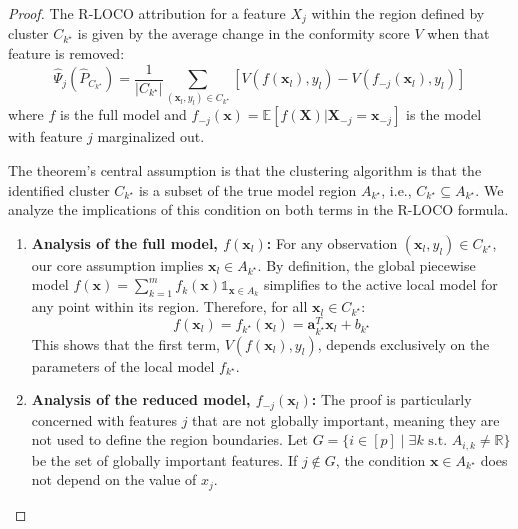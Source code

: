\documentclass{article}
\theoremstyle{plain}
\theoremstyle{definition}
\theoremstyle{remark}
\begin{document}
\begin{proof}
The R-LOCO attribution for a feature $X_j$ within the region defined by cluster $C_{k^\star}$ is given by the average change in the conformity score $V$ when that feature is removed:
$$
\hat{\Psi}_{j}(\hat{P}_{C_{k^\star}}) = \frac{1}{|C_{k^\star}|} \sum_{(\mathbf{x}_l, y_l) \in C_{k^\star}} \left[ V(f(\mathbf{x}_l), y_l) - V(f_{-j}(\mathbf{x}_l), y_l) \right]
$$
where $f$ is the full model and $f_{-j}(\mathbf{x}) = \mathbb{E}[f(\mathbf{X}) | \mathbf{X}_{-j} = \mathbf{x}_{-j}]$ is the model with feature $j$ marginalized out.

The theorem's central assumption is that the clustering algorithm is that the identified cluster $C_{k^\star}$ is a subset of the true model region $A_{k^\star}$, i.e., $C_{k^\star} \subseteq A_{k^\star}$. We analyze the implications of this condition on both terms in the R-LOCO formula.

\begin{enumerate}
    \item \textbf{Analysis of the full model, $f(\mathbf{x}_l)$:}
    For any observation $(\mathbf{x}_l, y_l) \in C_{k^\star}$, our core assumption implies $\mathbf{x}_l \in A_{k^\star}$. By definition, the global piecewise model $f(\mathbf{x}) = \sum_{k=1}^{m} f_k(\mathbf{x}) \mathds{1}_{\mathbf{x} \in A_k}$ simplifies to the active local model for any point within its region. Therefore, for all $\mathbf{x}_l \in C_{k^\star}$:
    $$
    f(\mathbf{x}_l) = f_{k^\star}(\mathbf{x}_l) = \mathbf{a}_{k^\star}^T \mathbf{x}_l + b_{k^\star}
    $$
    This shows that the first term, $V(f(\mathbf{x}_l), y_l)$, depends exclusively on the parameters of the local model $f_{k^\star}$.

    \item \textbf{Analysis of the reduced model, $f_{-j}(\mathbf{x}_l)$:}
    The proof is particularly concerned with features $j$ that are not globally important, meaning they are not used to define the region boundaries. Let $G = \{i \in [p] \mid \exists k \text{ s.t. } A_{i,k} \neq \mathbb{R}\}$ be the set of globally important features. If $j \notin G$, the condition $\mathbf{x} \in A_{k^\star}$ does not depend on the value of $x_j$.
    

\end{enumerate}
\end{proof}
\end{document}
